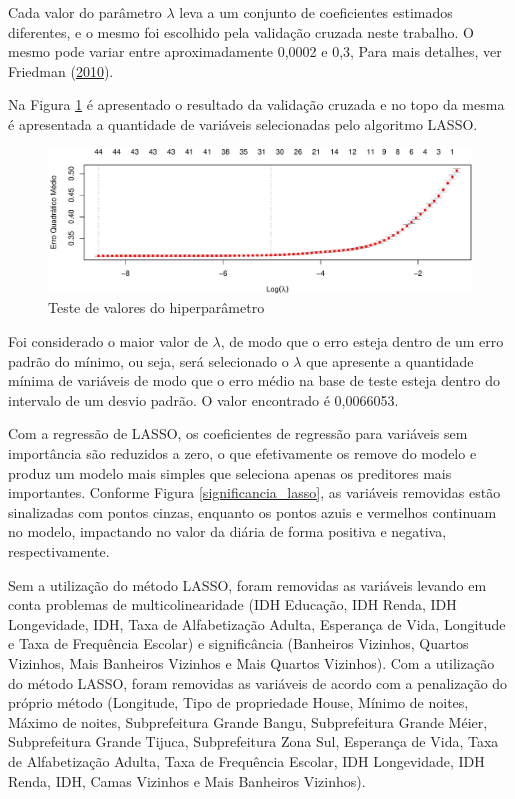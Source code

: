 \documentclass[
	12pt,				%
	a4paper,		%
	oneside,    %
	chapter=TITLE,		   %
	section=TITLE,		   %
	subsection=TITLE,	   %
	subsubsection=TITLE, %
	english,			%
	french,				%
	spanish,			%
	brazil,				%
]{abntex2}
\begin{document}
Cada valor do parâmetro \(\lambda\) leva a um conjunto de coeficientes
estimados diferentes, e o mesmo foi escolhido pela validação cruzada
neste trabalho. O mesmo pode variar entre aproximadamente 0,0002 e 0,3,
Para mais detalhes, ver Friedman
(\protect\hyperlink{ref-friedman2010regularization}{2010}).

Na Figura \ref{lasso_lambda} é apresentado o resultado da validação
cruzada e no topo da mesma é apresentada a quantidade de variáveis
selecionadas pelo algoritmo LASSO.

\begin{figure}
\centering
\includegraphics{00-TCC_files/figure-latex/lasso_lambda-1.pdf}
\caption{\label{lasso_lambda}Teste de valores do hiperparâmetro}
\end{figure}

Foi considerado o maior valor de \(\lambda\), de modo que o erro esteja
dentro de um erro padrão do mínimo, ou seja, será selecionado o
\(\lambda\) que apresente a quantidade mínima de variáveis de modo que o
erro médio na base de teste esteja dentro do intervalo de um desvio
padrão. O valor encontrado é 0,0066053.

Com a regressão de LASSO, os coeficientes de regressão para variáveis
sem importância são reduzidos a zero, o que efetivamente os remove do
modelo e produz um modelo mais simples que seleciona apenas os
preditores mais importantes. Conforme Figura \ref{significancia_lasso},
as variáveis removidas estão sinalizadas com pontos cinzas, enquanto os
pontos azuis e vermelhos continuam no modelo, impactando no valor da
diária de forma positiva e negativa, respectivamente.

Sem a utilização do método LASSO, foram removidas as variáveis levando
em conta problemas de multicolinearidade (IDH Educação, IDH Renda, IDH
Longevidade, IDH, Taxa de Alfabetização Adulta, Esperança de Vida,
Longitude e Taxa de Frequência Escolar) e significância (Banheiros
Vizinhos, Quartos Vizinhos, Mais Banheiros Vizinhos e Mais Quartos
Vizinhos). Com a utilização do método LASSO, foram removidas as
variáveis de acordo com a penalização do próprio método (Longitude, Tipo
de propriedade House, Mínimo de noites, Máximo de noites, Subprefeitura
Grande Bangu, Subprefeitura Grande Méier, Subprefeitura Grande Tijuca,
Subprefeitura Zona Sul, Esperança de Vida, Taxa de Alfabetização Adulta,
Taxa de Frequência Escolar, IDH Longevidade, IDH Renda, IDH, Camas
Vizinhos e Mais Banheiros Vizinhos).
\end{document}
